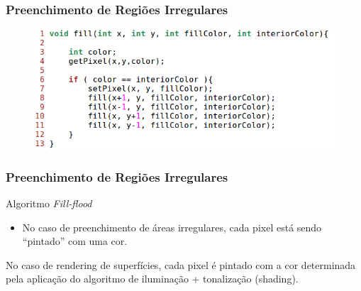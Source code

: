 \documentclass{beamer}
\begin{document}
\begin{frame}
\frametitle{Preenchimento de Regiões Irregulares}

	\begin{figure}[!h]
			\begin{flushleft}
				\includegraphics[width=1.0\textwidth]{Figures/FilFloAlg}
			\end{flushleft}
	\end{figure}
\end{frame}



\begin{frame}
\frametitle{Preenchimento de Regiões Irregulares}

	\begin{block}{Algoritmo \textit{Fill-flood}}
		\begin{itemize}
			\item No caso de preenchimento de áreas irregulares, cada pixel está sendo ``pintado'' com uma cor.
		\end{itemize}
	\end{block}
	
	\begin{block}{}
		No caso de rendering de superfícies, cada pixel é pintado com a cor determinada pela aplicação do algoritmo de iluminação + tonalização (shading).
	\end{block}
\end{frame}

\end{document}
